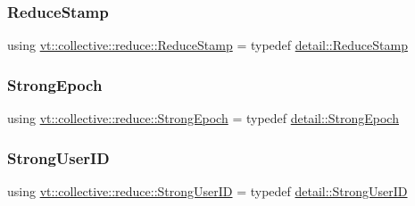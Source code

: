 \subsubsection{\texorpdfstring{Reduce\+Stamp}{ReduceStamp}}
{\footnotesize\ttfamily using \hyperlink{namespacevt_1_1collective_1_1reduce_a7b7cb3021ac5654d92825d9fab0250b2}{vt\+::collective\+::reduce\+::\+Reduce\+Stamp} = typedef \hyperlink{namespacevt_1_1collective_1_1reduce_1_1detail_aacc1fcd729d934ba143fee3a943bf9e7}{detail\+::\+Reduce\+Stamp}}

\mbox{\label{namespacevt_1_1collective_1_1reduce_a0b5fbe1e89aea537d76fda4c57f2099e}} 
\subsubsection{\texorpdfstring{Strong\+Epoch}{StrongEpoch}}
{\footnotesize\ttfamily using \hyperlink{namespacevt_1_1collective_1_1reduce_a0b5fbe1e89aea537d76fda4c57f2099e}{vt\+::collective\+::reduce\+::\+Strong\+Epoch} = typedef \hyperlink{namespacevt_1_1collective_1_1reduce_1_1detail_a9e57fa5e7a2557a92ce0739edae200fe}{detail\+::\+Strong\+Epoch}}

\mbox{\label{namespacevt_1_1collective_1_1reduce_a49e47347201b1b0fdb552ed4b7c86331}} 
\subsubsection{\texorpdfstring{Strong\+User\+ID}{StrongUserID}}
{\footnotesize\ttfamily using \hyperlink{namespacevt_1_1collective_1_1reduce_a49e47347201b1b0fdb552ed4b7c86331}{vt\+::collective\+::reduce\+::\+Strong\+User\+ID} = typedef \hyperlink{namespacevt_1_1collective_1_1reduce_1_1detail_af9e42b20d1be7dccc1b5e587f0387e02}{detail\+::\+Strong\+User\+ID}}

\mbox{\label{namespacevt_1_1collective_1_1reduce_ae3111ccd7e2214f079222e4c016b6652}} 
